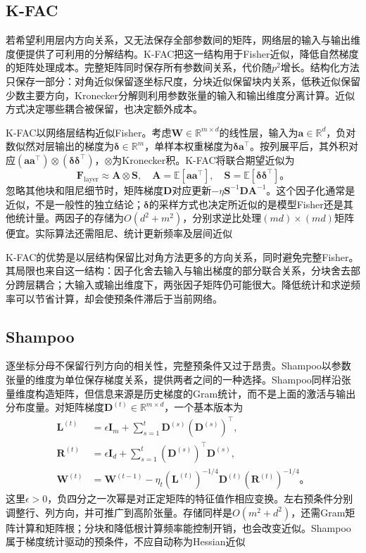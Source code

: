 \subsection{K-FAC}
\label{sec:training-structured-preconditioning}

若希望利用层内方向关系，又无法保存全部参数间的矩阵，网络层的输入与输出维度便提供了可利用的分解结构。K-FAC把这一结构用于Fisher近似，降低自然梯度的矩阵处理成本。完整矩阵同时保存所有参数间关系，代价随$p^2$增长。结构化方法只保存一部分：对角近似保留逐坐标尺度，分块近似保留块内关系，低秩近似保留少数主要方向，Kronecker分解则利用参数张量的输入和输出维度分离计算。近似方式决定哪些耦合被保留，也决定额外成本。

K-FAC以网络层结构近似Fisher。考虑$\bm W\in\mathbb R^{m\times d}$的线性层，输入为$\bm a\in\mathbb R^d$，负对数似然对层输出的梯度为$\bm\delta\in\mathbb R^m$，单样本权重梯度为$\bm\delta\bm a^{\top}$。按列展平后，其外积对应$(\bm a\bm a^{\top})\otimes(\bm\delta\bm\delta^{\top})$，$\otimes$为Kronecker积。K-FAC将联合期望近似为
\begin{equation}
  \bm F_{\mathrm{layer}}\approx\bm A\otimes\bm S,
  \quad\bm A=\mathbb E[\bm a\bm a^{\top}],\quad
  \bm S=\mathbb E[\bm\delta\bm\delta^{\top}]\text{。}
  \label{eq:training-kfac}
\end{equation}
忽略其他块和阻尼细节时，矩阵梯度$\bm D$对应更新$-\eta\bm S^{-1}\bm D\bm A^{-1}$。这个因子化通常是近似，不是一般性的独立结论；$\bm\delta$的采样方式也决定所近似的是模型Fisher还是其他统计量。两因子的存储为$O(d^2+m^2)$，分别求逆比处理$(md)\times(md)$矩阵便宜。实际算法还需阻尼、统计更新频率及层间近似

K-FAC的优势是以层结构保留比对角方法更多的方向关系，同时避免完整Fisher。其局限也来自这一结构：因子化舍去输入与输出梯度的部分联合关系，分块舍去部分跨层耦合；大输入或输出维度下，两张因子矩阵仍可能很大。降低统计和求逆频率可以节省计算，却会使预条件滞后于当前网络。

\subsection{Shampoo}
\label{sec:training-shampoo}

逐坐标分母不保留行列方向的相关性，完整预条件又过于昂贵。Shampoo以参数张量的维度为单位保存梯度关系，提供两者之间的一种选择。Shampoo同样沿张量维度构造矩阵，但信息来源是历史梯度的Gram统计，而不是上面的激活与输出分布度量。对矩阵梯度$\bm D^{(t)}\in\mathbb R^{m\times d}$，一个基本版本为
\begin{align}
  \bm L^{(t)}&=\epsilon\bm I_m+\sum_{s=1}^t\bm D^{(s)}(\bm D^{(s)})^{\top},\\
  \bm R^{(t)}&=\epsilon\bm I_d+\sum_{s=1}^t(\bm D^{(s)})^{\top}\bm D^{(s)},\\
  \bm W^{(t)}&=\bm W^{(t-1)}-
    \eta_t(\bm L^{(t)})^{-1/4}\bm D^{(t)}(\bm R^{(t)})^{-1/4}\text{。}
  \label{eq:training-shampoo}
\end{align}
这里$\epsilon>0$，负四分之一次幂是对正定矩阵的特征值作相应变换。左右预条件分别调整行、列方向，并可推广到高阶张量。存储同样是$O(m^2+d^2)$，还需Gram矩阵计算和矩阵根；分块和降低根计算频率能控制开销，也会改变近似。Shampoo属于梯度统计驱动的预条件，不应自动称为Hessian近似

